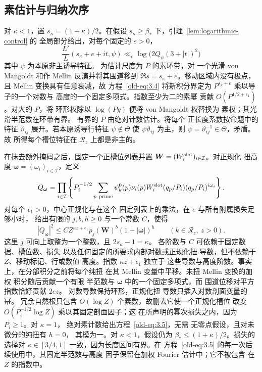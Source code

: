 \subsection{素估计与归纳次序}\label{sec:weighted}

对 \(\kappa<1\)，置 \(s_\kappa=(1+\kappa)/2\)。在假设
\(s_\kappa\ge\beta_*\) 下，引理~\ref{lem:logarithmic-control} 的
全局部分给出，对每个固定的 \(e>0\)，
\begin{equation}
 \frac{L'}{L}(s_\kappa+e+it,\psi)
 \ll_e \log\!\bigl(2Q_\psi(3+|t|)^2\bigr)
 \label{old-eq:3.4}
\end{equation}
其中 \(\psi\) 为本原非主诱导特征。
为估计尺度为 \(P\) 的素环带，对
一个光滑 von Mangoldt 和作 Mellin 反演并将其围道移到
\(\Re s=s_\kappa+e\)。移动区域内没有极点，
且 Mellin 变换具有任意衰减，故
方程~\eqref{old-eq:3.4} 将新积分界定为
\(P^{s_\kappa+e}\) 乘以导子的一个对数与
高度的一个固定多项式。指数至少为二的素幂
贡献 \(O(P^{1/2+\epsilon_1})\)。对大的 \(P\)，将
环形权除以 \(\log(Py)\) 便将 von Mangoldt 权替换为
素权；其光滑半范数在环带有界。
有界的 \(P\) 由绝对计数估计。将每个
正长度系数按命题中的特征 \(\vartheta_{ij}\)
展开。若本原诱导行特征
\(\psi\notin\Theta\) 使 \(\psi\vartheta_{ij}\) 为主，则
\(\psi=\vartheta_{ij}^{-1}\in\Theta\)，矛盾。故
所得每个槽位特征在 \(\mathcal R_z\) 上都是非主的。

在抹去额外掩码之后，固定一个正槽位列表并置
\(\boldsymbol W=(W_i^{\rm slot})_{i\in\mathcal I}\)。对正规化
扭高度 \(\boldsymbol\omega=(\omega_i)_{i\in\mathcal I}\)，定义
\[
 Q_{\boldsymbol\omega}
 =\prod_{i\in\mathcal I}\left\{P_i^{-1/2}
   \sum_{p\ {\rm prime}}\psi_k^0(p)\nu_i(p)W_i^{\rm slot}(q_p/P_i)
                       (q_p/P_i)^{i\omega_i}\right\}.
\]
对每个 \(\epsilon_1>0\)，中心正规化与在这个
固定列表上的乘法，在 \(e\) 与所有附属损失足够小时，
给出有限的 \(j,b,h\ge0\) 与一个常数 \(C\)，使得
\begin{equation}
 |Q_{\boldsymbol\omega}|^2
 \le C Z^{\kappa z+\epsilon_1}p_j(\boldsymbol W)^b
                 (1+|\boldsymbol\omega|)^h
 \qquad(k\in\mathcal R_z,\ z>0).
 \label{old-eq:3.5}
\end{equation}
这里 \(j\) 可向上取整为一个整数，且 \(2s_\kappa-1=\kappa\)。
各阶数与 \(C\) 可依赖于固定数据、槽位数、损失
以及任何固定的所要求内部对数或正规化扭
导数，但不依赖于 \(Z\)、移动标记、行或数值
高度。指数 \(\kappa z+\epsilon_1\) 独立于
这些导数与高度阶数。事实上，在分部积分之前将每个纯扭
在其 Mellin 变量中平移。未扭 Mellin 变换的加权
积分随后贡献一个有限
半范数与 \(\boldsymbol\omega\) 中的一个固定多项式，而
围道位移对平方指数恰好贡献 \(2ez\)。
对数导数保持环形，正规化扭
导数只插入对数剖面变量的幂。
冗余自然根只包含
\(O(\log Z)\) 个素数，故删去它使一个正规化槽位
改变 \(O(P_i^{-1/2}\log Z)\) 乘以其固定剖面因子；这
在所声明的幂次损失之内，因为 \(P_i\ge1\)。对 \(\kappa=1\)，
绝对素计数给出方程~\eqref{old-eq:3.5}，无需
无零点假设，且对未微分的纯扭有 \(h=0\)，
其模为一。对 \(\kappa<1\)，假设仍为
\(\beta_*\le(1+\kappa)/2\)。损失的选择对
\(\kappa\in[3/4,1]\) 一致，因为长度区间有界。在
方程~\eqref{old-eq:3.5} 的每一次后续使用中，其固定半范数与高度
因子保留在加权 Fourier 估计中；它不被包含
在 \(Z\) 的指数中。
